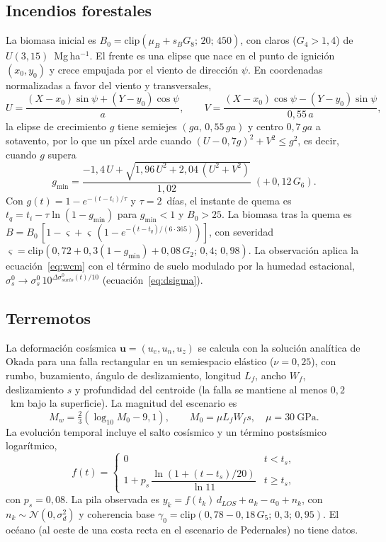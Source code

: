\documentclass[11pt,a4paper]{article}
\newcommand{\vect}[1]{\mathbf{#1}}
\begin{document}
\subsection{Incendios forestales}
La biomasa inicial es $B_0 = \mathrm{clip}(\mu_B + s_B G_8;\, 20;\, 450)$, con claros ($G_4 > 1{,}4$) de
$U(3,15)$~Mg\,ha$^{-1}$. El frente es una elipse que nace en el punto de ignición $(x_0,y_0)$ y crece
empujada por el viento de dirección $\psi$. En coordenadas normalizadas a favor del viento y
transversales,
\begin{equation}
  U = \frac{(X-x_0)\sin\psi + (Y-y_0)\cos\psi}{a},\qquad V = \frac{(X-x_0)\cos\psi - (Y-y_0)\sin\psi}{0{,}55\,a},
\end{equation}
la elipse de crecimiento $g$ tiene semiejes $(g a,\, 0{,}55\,g a)$ y centro $0{,}7\,g a$ a sotavento, por
lo que un píxel arde cuando $(U-0{,}7g)^2 + V^2 \le g^2$, es decir, cuando $g$ supera
\begin{equation}
  g_{\min} = \frac{-1{,}4\,U + \sqrt{1{,}96\,U^2 + 2{,}04\,(U^2+V^2)}}{1{,}02} \;(+\,0{,}12\,G_6).
\end{equation}
Con $g(t) = 1 - e^{-(t-t_i)/\tau}$ y $\tau = 2$~días, el instante de quema es
$t_q = t_i - \tau\ln(1-g_{\min})$ para $g_{\min}<1$ y $B_0>25$. La biomasa tras la quema es
$B = B_0\,[1 - \varsigma + \varsigma\,(1 - e^{-(t-t_q)/(6\cdot 365)})]$, con severidad
$\varsigma = \mathrm{clip}(0{,}72 + 0{,}3(1-g_{\min}) + 0{,}08\,G_2;\, 0{,}4;\, 0{,}98)$. La observación aplica
la ecuación~\eqref{eq:wcm} con el término de suelo modulado por la humedad estacional,
$\sigma^0_s\to\sigma^0_s\,10^{\Delta\sigma^0_{suelo}(t)/10}$ (ecuación~\ref{eq:dsigma}).

\subsection{Terremotos}
La deformación cosísmica $\vect u = (u_e, u_n, u_z)$ se calcula con la solución analítica de Okada
\cite{okada1985} para una falla rectangular en un semiespacio elástico ($\nu = 0{,}25$), con rumbo,
buzamiento, ángulo de deslizamiento, longitud $L_f$, ancho $W_f$, deslizamiento $s$ y profundidad del
centroide (la falla se mantiene al menos $0{,}2$~km bajo la superficie). La magnitud del escenario es
\begin{equation}
  M_w = \tfrac23\left(\log_{10}M_0 - 9{,}1\right),\qquad M_0 = \mu L_f W_f s,\quad \mu = 30~\mathrm{GPa}.
\end{equation}
La evolución temporal incluye el salto cosísmico y un término postsísmico logarítmico,
\begin{equation}
  f(t) = \begin{cases} 0 & t < t_s,\\ 1 + p_s\,\dfrac{\ln\!\left(1 + (t-t_s)/20\right)}{\ln 11} & t\ge t_s,\end{cases}
\end{equation}
con $p_s = 0{,}08$. La pila observada es $y_k = f(t_k)\,d_{LOS} + a_k - a_0 + n_k$, con
$n_k\sim\mathcal N(0,\sigma_d^2)$ y coherencia base $\gamma_0 = \mathrm{clip}(0{,}78 - 0{,}18\,G_5;\,0{,}3;\,0{,}95)$.
El océano (al oeste de una costa recta en el escenario de Pedernales) no tiene datos.
\end{document}
